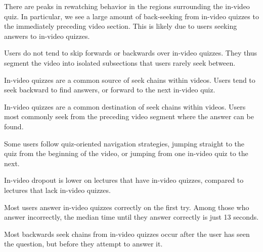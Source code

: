\documentclass{sigchi}
\begin{document}
\begin{compactitem}
\item There are peaks in rewatching behavior in the regions surrounding the in-video quiz. In particular, we see a large amount of back-seeking from in-video quizzes to the immediately preceding video section. This is likely due to users seeking answers to in-video quizzes.
\item Users do not tend to skip forwards or backwards over in-video quizzes. They thus segment the video into isolated subsections that users rarely seek between.
\item In-video quizzes are a common source of seek chains within videos. Users tend to seek backward to find answers, or forward to the next in-video quiz.
\item In-video quizzes are a common destination of seek chains within videos. Users most commonly seek from the preceding video segment where the answer can be found.
\item Some users follow quiz-oriented navigation strategies, jumping straight to the quiz from the beginning of the video, or jumping from one in-video quiz to the next.
\item In-video dropout is lower on lectures that have in-video quizzes, compared to lectures that lack in-video quizzes.
\item Most users answer in-video quizzes correctly on the first try. Among those who answer incorrectly, the median time until they answer correctly is just 13 seconds.
\item Most backwards seek chains from in-video quizzes occur after the user has seen the question, but before they attempt to answer it.
\end{compactitem}

\end{document}

